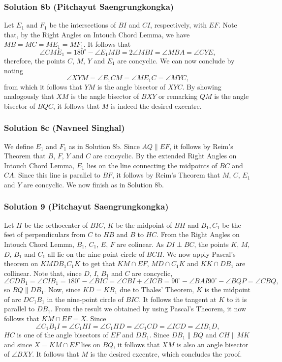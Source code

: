 \subsubsection{Solution 8b (Pitchayut Saengrungkongka)}
Let $E_1$ and $F_1$ be the intersections of $BI$ and $CI$, respectively, with $EF$. Note that, by the Right Angles on Intouch Chord Lemma, we have $MB=MC=ME_1=MF_1$.
\nl
It follows that
$$\angle CME_1=180^\circ-\angle E_1MB=2\angle MBI=\angle MBA=\angle CYE,$$
therefore, the points $C$, $M$, $Y$ and $E_1$ are concyclic. We can now conclude by noting
$$\angle XYM=\angle E_1CM=\angle ME_1C=\angle MYC,$$
from which it follows that $YM$ is the angle bisector of $XYC$. By showing analogously that $XM$ is the angle bisector of $BXY$ or remarking $QM$ is the angle bisector of $BQC$, it follows that $M$ is indeed the desired excentre.
\subsubsection{Solution 8c (Navneel Singhal)}
We define $E_1$ and $F_1$ as in Solution 8b. Since $AQ\parallel EF$, it follows by Reim's Theorem that $B$, $F$, $Y$ and $C$ are concyclic. By the extended Right Angles on Intouch Chord Lemma, $E_1$ lies on the line connecting the midpoints of $BC$ and $CA$. Since this line is parallel to $BF$, it follows by Reim's Theorem that $M$, $C$, $E_1$ and $Y$ are concyclic. We now finish as in Solution 8b.
\subsubsection{Solution 9 (Pitchayut Saengrungkongka)}
Let $H$ be the orthocenter of $BIC$, $K$ be the midpoint of $BH$ and $B_1, C_1$ be the feet of perpendiculars from $C$ to $HB$ and $B$ to $HC$. From the Right Angles on Intouch Chord Lemma, $B_1$,  $C_1$, $E$, $F$ are colinear.
\nl
As $DI\perp BC$, the points $K$, $M$, $D$, $B_1$ and $C_1$ all lie on the nine-point circle of $BCH$. We now apply Pascal's theorem on $KMDB_1C_1K$ to get that $KM \cap EF$, $MD \cap C_1K$ and $KK \cap DB_1$ are collinear. Note that, since $D$, $I$, $B_1$ and $C$ are concyclic,
$$\angle CDB_1 = \angle CIB_1= 180^\circ-\angle BIC=\angle CBI+\angle ICB=90^\circ-\angle BAI90^\circ-\angle BQP=\angle CBQ,$$ so $BQ \parallel DB_1$. Now, since $KD=KB_1$ due to Thales' Theorem, $K$ is the midpoint of arc $DC_1B_1$ in the nine-point circle of $BIC$. It follows the tangent at $K$ to it is parallel to $DB_1$. From the result we obtained by using Pascal's Theorem, it now follows that $KM\cap EF=X$.
\nl
Since
$$\angle C_1B_1I=\angle C_1HI=\angle C_1HD=\angle C_1CD=\angle ICD=\angle IB_1D,$$ $HC$ is one of the angle bisectors of $EF$ and $DB_1$. Since $DB_1\parallel BQ$ and $CH\parallel MK$ and since $X=KM\cap EF$ lies on $BQ$, it follows that $XM$ is also an angle bisector of $\angle BXY$. It follows that $M$ is the desired excentre, which concludes the proof.
